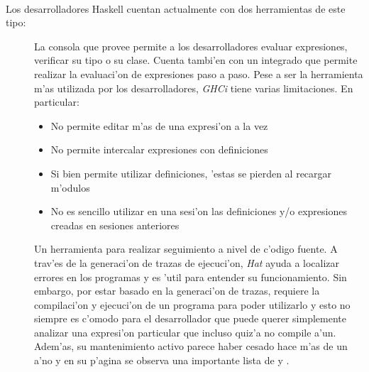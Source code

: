 \documentclass[a4paper]{article}
\begin{document}
\paragraph{}Los desarrolladores Haskell cuentan actualmente con dos herramientas de este tipo:
\begin{description}
	\item[]
		La consola que provee  permite a los desarrolladores evaluar expresiones, verificar su tipo o su clase.  Cuenta tambi'en con un  integrado que permite realizar la evaluaci'on de expresiones paso a paso.  Pese a ser la herramienta m'as utilizada por los desarrolladores, \textit{GHCi} tiene varias limitaciones.  En particular:
		\begin{itemize}
			\item No permite editar m'as de una expresi'on a la vez
			\item No permite intercalar expresiones con definiciones
			\item	Si bien permite utilizar definiciones, 'estas se pierden al recargar m'odulos
			\item No es sencillo utilizar en una sesi'on las definiciones y/o expresiones creadas en sesiones anteriores
		\end{itemize}
	\item[]
		Un herramienta para realizar seguimiento a nivel de c'odigo fuente.  A trav'es de la generaci'on de trazas de ejecuci'on, \textit{Hat} ayuda a localizar errores en los programas y es 'util para entender su funcionamiento.  Sin embargo, por estar basado en la generaci'on de trazas, requiere la compilaci'on y ejecuci'on de un programa para poder utilizarlo y esto no siempre es c'omodo para el desarrollador que puede querer simplemente analizar una expresi'on particular que incluso quiz'a no compile a'un.  Adem'as, su mantenimiento activo parece haber cesado hace m'as de un a'no y en su p'agina se observa una importante lista de  y .  
\end{description}
\end{document}
